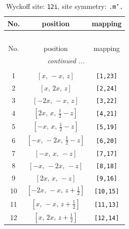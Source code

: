 \documentclass[fleqn,8pt]{jsarticle}
\begin{document}
\begin{longtable}{ccc}
\caption{Wyckoff site: {\tt 12i}, site symmetry: {\tt .m'.}}
 \\
 \hline \hline
No. & position & mapping \\ \hline \endfirsthead

\multicolumn{2}{l}{\tablename\ \thetable{}} \\
 \hline \hline
No. & position & mapping \\ \hline \endhead

 \hline \hline
\multicolumn{2}{r}{\footnotesize\it continued ...} \\ \endfoot

 \hline \hline
\multicolumn{2}{r}{} \\ \endlastfoot

1 & $\left[ x,\, - x,\, z \right]$ & {\tt [1,23]} \\ \hline
2 & $\left[ x,\, 2 x,\, z \right]$ & {\tt [2,24]} \\ \hline
3 & $\left[ - 2 x,\, - x,\, z \right]$ & {\tt [3,22]} \\ \hline
4 & $\left[ 2 x,\, x,\, \frac{1}{2} - z \right]$ & {\tt [4,21]} \\ \hline
5 & $\left[ - x,\, x,\, \frac{1}{2} - z \right]$ & {\tt [5,19]} \\ \hline
6 & $\left[ - x,\, - 2 x,\, \frac{1}{2} - z \right]$ & {\tt [6,20]} \\ \hline
7 & $\left[ - x,\, x,\, - z \right]$ & {\tt [7,17]} \\ \hline
8 & $\left[ - x,\, - 2 x,\, - z \right]$ & {\tt [8,18]} \\ \hline
9 & $\left[ 2 x,\, x,\, - z \right]$ & {\tt [9,16]} \\ \hline
10 & $\left[ - 2 x,\, - x,\, z + \frac{1}{2} \right]$ & {\tt [10,15]} \\ \hline
11 & $\left[ x,\, - x,\, z + \frac{1}{2} \right]$ & {\tt [11,13]} \\ \hline
12 & $\left[ x,\, 2 x,\, z + \frac{1}{2} \right]$ & {\tt [12,14]} \\
\end{longtable}
\renewcommand{\arraystretch}{1.2}
\end{document}
